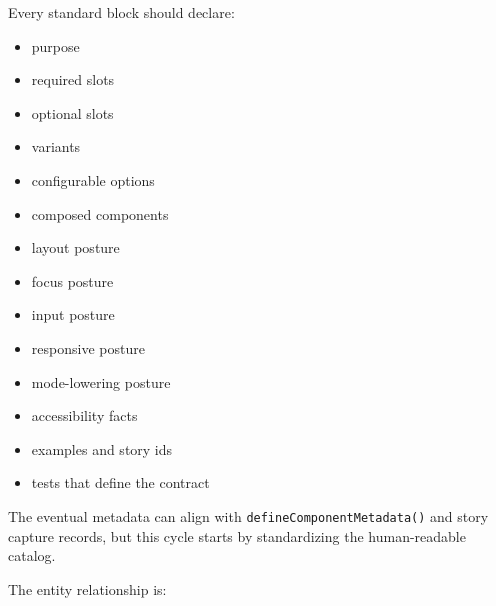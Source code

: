 Every standard block should declare:

\begin{itemize}
\tightlist
\item
  purpose
\item
  required slots
\item
  optional slots
\item
  variants
\item
  configurable options
\item
  composed components
\item
  layout posture
\item
  focus posture
\item
  input posture
\item
  responsive posture
\item
  mode-lowering posture
\item
  accessibility facts
\item
  examples and story ids
\item
  tests that define the contract
\end{itemize}

The eventual metadata can align with \texttt{d\allowbreak{}e\allowbreak{}f\allowbreak{}i\allowbreak{}n\allowbreak{}e\allowbreak{}C\allowbreak{}o\allowbreak{}m\allowbreak{}p\allowbreak{}o\allowbreak{}n\allowbreak{}e\allowbreak{}n\allowbreak{}t\allowbreak{}M\allowbreak{}e\allowbreak{}t\allowbreak{}a\allowbreak{}d\allowbreak{}a\allowbreak{}t\allowbreak{}a\allowbreak{}(\allowbreak{})} and story capture records, but this cycle starts by standardizing the human-readable catalog.

The entity relationship is:

